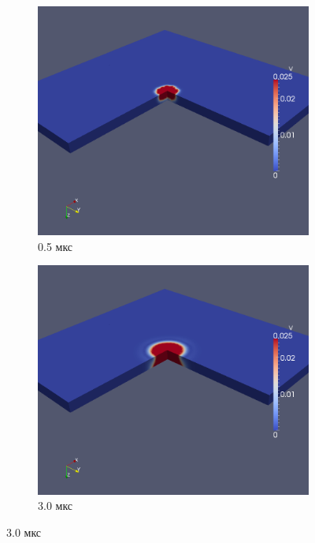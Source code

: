 \begin{figure}[htp]
\begin{subfigure}[b]{0.5\textwidth}
\centering
\includegraphics[width=\textwidth]{png/pkm-experiment/wing-only/wave-3d/v-0001.png}
\caption{0.5 мкс}
\end{subfigure}
\begin{subfigure}[b]{0.5\textwidth}
\centering
\includegraphics[width=\textwidth]{png/pkm-experiment/wing-only/wave-3d/v-0005.png}
\caption{3.0 мкс}
\end{subfigure}

\end{figure}
